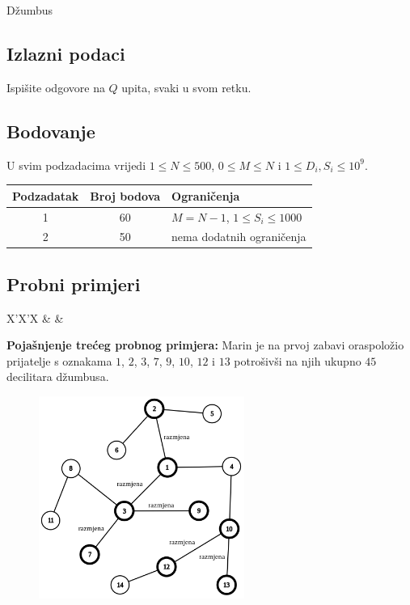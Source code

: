 \begin{statement}[
  problempoints=110,
  timelimit=1 sekunda,
  memorylimit=512 MiB,
]{Džumbus}
\subsection*{Izlazni podaci}
Ispišite odgovore na $Q$ upita, svaki u svom retku.


\subsection*{Bodovanje}
U svim podzadacima vrijedi $1 \le N \le 500$, $0 \le M \le N$ i $1 \le D_i, S_i \le 10^9$.

{\renewcommand{\arraystretch}{1.4}
  \setlength{\tabcolsep}{6pt}
  \begin{tabular}{ccl}
 Podzadatak & Broj bodova & Ograničenja \\ \midrule
  1 & 60 & $M = N - 1$, $1 \le S_i \le 1000$ \\
  2 & 50 & nema dodatnih ograničenja \\
\end{tabular}}

\subsection*{Probni primjeri}
\begin{tabularx}{\textwidth}{X'X'X}
 &
 &
\end{tabularx}

\textbf{Pojašnjenje trećeg probnog primjera:}
Marin je na prvoj zabavi oraspoložio prijatelje s oznakama
$1$, $2$, $3$, $7$, $9$, $10$, $12$ i $13$ potrošivši na njih
ukupno $45$ decilitara džumbusa.

\setlength\intextsep{-0.5cm}
\begin{figure}
\centering
\includegraphics[width=0.6\textwidth]{img/tree.png}
\end{figure}


\end{statement}
